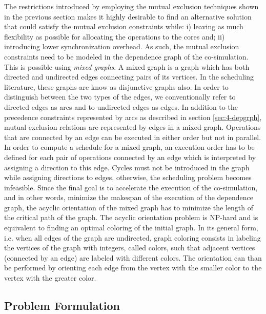 The restrictions introduced by employing the mutual exclusion techniques shown in the previous section makes it highly desirable to find an alternative solution that could satisfy the mutual exclusion constraints while: i) leaving as much flexibility as possible for allocating the operations to the cores and; ii) introducing lower synchronization overhead. As such, the mutual exclusion constraints need to be modeled in the dependence graph of the co-simulation. This is possible using \textit{mixed graphs}. A mixed graph is a graph which has both directed and undirected edges connecting pairs of its vertices. In the scheduling literature, these graphs are know as disjunctive graphs also. In order to distinguish between the two types of the edges, we conventionally refer to directed edges as arcs and to undirected edges as edges. In addition to the precedence constraints represented by arcs as described in section \ref{sec:4-depgrph}, mutual exclusion relations are represented by edges in a mixed graph. Operations that are connected by an edge can be executed in either order but not in parallel. In order to compute a schedule for a mixed graph, an execution order has to be defined for each pair of operations connected by an edge which is interpreted by assigning a direction to this edge. Cycles must not be introduced in the graph while assigning directions to edges, otherwise, the scheduling problem becomes infeasible. Since the final goal is to accelerate the execution of the co-simulation, and in other words, minimize the makespan of the execution of the dependence graph, the acyclic orientation of the mixed graph has to minimize the length of the critical path of the graph. 
The acyclic orientation problem is NP-hard and is equivalent to finding an optimal coloring of the initial graph. In its general form, i.e. when all edges of the graph are undirected, graph coloring consists in labeling the vertices of the graph with integers, called colors, such that adjacent vertices (connected by an edge) are labeled with different colors. The orientation can than be performed by orienting each edge from the vertex with the smaller color to the vertex with the greater color.
 
\subsection{Problem Formulation}

